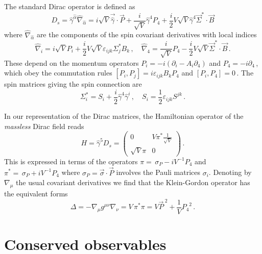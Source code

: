 \documentclass[a4paper,12pt]{article}
\begin{document}
The standard Dirac operator is defined as \cite{CV2}
\begin{equation}\label{(de)}
{D}_{s}=\hat\gamma^{\hat\alpha}\hat\nabla_{\hat\alpha}  
=i\sqrt{V}\vec{\hat\gamma}\cdot\vec{P}
+\frac{i}{\sqrt{V}}\hat\gamma^{4}P_{4}
+\frac{i}{2} V\sqrt{V}\hat\gamma^{4}\vec{\Sigma}^{*}\cdot\vec{B}
\end{equation}
where  $\hat\nabla_{\hat\alpha}$ are the components of the  
spin covariant derivatives with local indices 
\begin{equation}\label{sder}
\hat\nabla_{i}=i\sqrt{V}P_{i}+\frac{i}{2}V\sqrt{V}\varepsilon_{ijk}
\Sigma_{j}^{*}B_{k}\,,\quad
\hat\nabla_{4}=\frac{i}{\sqrt{V}}P_{4}-\frac{i}{2}V\sqrt{V}
\vec{\Sigma}^{*}\cdot\vec{B}\,.
\end{equation}
These depend on the momentum operators  
$P_{i}=-i(\partial_{i}-A_{i}\partial_{4})$ and $P_{4}=-i\partial_{4}$\,,
which obey the commutation rules
$[P_{i},P_{j}]=i\varepsilon_{ijk}B_{k}P_{4}$ and
$[P_{i},P_{4}]=0$\,. 
The spin matrices giving the spin connection are  
\begin{equation}\label{sigst}
\Sigma_{i}^{*}=S_{i}+\frac{i}{2}\hat\gamma^{4}\hat\gamma^{i} \,, \quad
S_{i}=\frac{1}{2}\varepsilon_{ijk}S^{jk}\,.
\end{equation}

In our representation of the Dirac matrices, the Hamiltonian operator of the 
{\em massless} Dirac field reads \cite{CV2}
\begin{equation}\label{HH}
H =\hat\gamma^5{D}_{s}=\left(
\begin{array}{cc}
0&V\pi^{*}\frac{\textstyle 1}{\textstyle \sqrt{V}}\\
\sqrt{V}\pi&0
\end{array}\right)\,.
\end{equation}
This is expressed in terms of the operators 
$\pi=\,{\sigma}_{P}-iV^{-1}P_{4}$ and 
$\pi^{*}=\,{\sigma}_{P}+iV^{-1}P_{4}$ 
where $\sigma_P=\vec{\sigma}\cdot\vec{P}$ 
involves the Pauli matrices $\sigma_i$. Denoting by 
$\nabla_{\mu}$ the usual covariant derivatives we find that the Klein-Gordon 
operator has the equivalent forms   
\begin{equation}
\Delta= -\nabla_{\mu}g^{\mu\nu}\nabla_{\nu}=V\,\pi^{*}\pi= 
V{\vec{P}\,}^{2}+\frac{1}{V}{P_{4}}^{2}\,.
\end{equation}

\section{Conserved observables}
\end{document}
